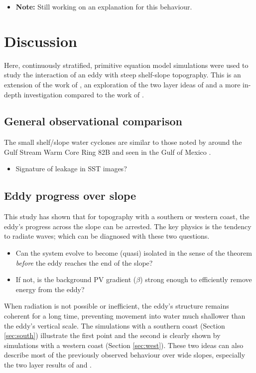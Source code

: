 \begin{itemize}
\item \textbf{Note:} Still working on an explanation for this behaviour.
\end{itemize}
\section{Discussion}
\label{sec-7}
Here, continuously stratified, primitive equation model simulations were used to study the interaction of an eddy with steep shelf-slope topography. This is an extension of the work of \citet{Wang1992}, an exploration of the two layer ideas of \citet{LaCasce1996, Jacob2002} and a more in-depth investigation compared to the work of \citet{Wei2009}.
\subsection{General observational comparison}
\label{sec-7-1}
The small shelf/slope water cyclones are similar to those noted by \citet{Kennelly1985} around the Gulf Stream Warm Core Ring 82B and seen in the Gulf of Mexico \citep{Frolov2004}.
\begin{itemize}
\item Signature of leakage in SST images?
\end{itemize}
\subsection{Eddy progress over slope}
\label{sec-7-2}
This study has shown that for topography with a southern or western coast, the eddy's progress across the slope can be arrested. The key physics is the tendency to radiate waves; which can be diagnosed with these two questions.
\begin{itemize}
\item Can the system evolve to become (quasi) isolated in the sense of the \cite{Flierl1983} theorem \emph{before} the eddy reaches the end of the slope?
\item If not, is the background PV gradient ($β$) strong enough to efficiently remove energy from the eddy?
\end{itemize}
When radiation is not possible or inefficient, the eddy's structure remains coherent for a long time, preventing movement into water much shallower than the eddy's vertical scale. The simulations with a southern coast (Section \ref{sec:south}) illustrate the first point and the second is clearly shown by simulations with a western coast (Section \ref{sec:west}). These two ideas can also describe most of the previously observed behaviour over wide slopes, especially the two layer results of \citet{LaCasce1998} and \citet{Jacob2002}.

